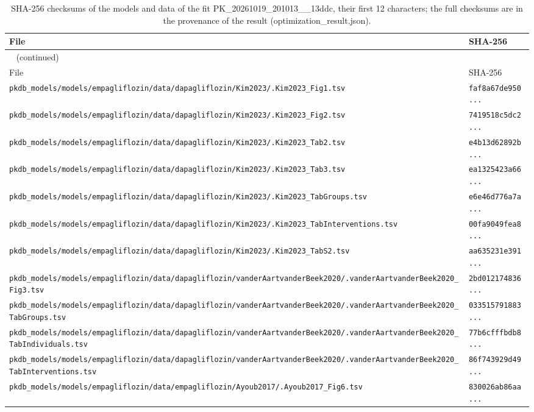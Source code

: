 \documentclass{article}
\begin{document}
\begin{longtable}{ll}
\caption{SHA-256 checksums of the models and data of the fit PK\_20261019\_201013\_\_13ddc, their first 12 characters; the full checksums are in the provenance of the result (optimization\_result.json).}\label{tab:checksums:PK_20261019_201013__13ddc} \\
\toprule
File & SHA-256 \\
\midrule
\endfirsthead
\multicolumn{2}{l}{\small\tablename~\thetable{} (continued)} \\
\toprule
File & SHA-256 \\
\midrule
\endhead
\bottomrule
\endlastfoot
\texttt{pkdb\_models/models/empagliflozin/data/dapagliflozin/Kim2023/.Kim2023\_Fig1.tsv} & \texttt{faf8a67de950...} \\
\texttt{pkdb\_models/models/empagliflozin/data/dapagliflozin/Kim2023/.Kim2023\_Fig2.tsv} & \texttt{7419518c5dc2...} \\
\texttt{pkdb\_models/models/empagliflozin/data/dapagliflozin/Kim2023/.Kim2023\_Tab2.tsv} & \texttt{e4b13d62892b...} \\
\texttt{pkdb\_models/models/empagliflozin/data/dapagliflozin/Kim2023/.Kim2023\_Tab3.tsv} & \texttt{ea1325423a66...} \\
\texttt{pkdb\_models/models/empagliflozin/data/dapagliflozin/Kim2023/.Kim2023\_TabGroups.tsv} & \texttt{e6e46d776a7a...} \\
\texttt{pkdb\_models/models/empagliflozin/data/dapagliflozin/Kim2023/.Kim2023\_TabInterventions.tsv} & \texttt{00fa9049fea8...} \\
\texttt{pkdb\_models/models/empagliflozin/data/dapagliflozin/Kim2023/.Kim2023\_TabS2.tsv} & \texttt{aa635231e391...} \\
\texttt{pkdb\_models/models/empagliflozin/data/dapagliflozin/vanderAartvanderBeek2020/.vanderAartvanderBeek2020\_Fig3.tsv} & \texttt{2bd012174836...} \\
\texttt{pkdb\_models/models/empagliflozin/data/dapagliflozin/vanderAartvanderBeek2020/.vanderAartvanderBeek2020\_TabGroups.tsv} & \texttt{033515791883...} \\
\texttt{pkdb\_models/models/empagliflozin/data/dapagliflozin/vanderAartvanderBeek2020/.vanderAartvanderBeek2020\_TabIndividuals.tsv} & \texttt{77b6cfffbdb8...} \\
\texttt{pkdb\_models/models/empagliflozin/data/dapagliflozin/vanderAartvanderBeek2020/.vanderAartvanderBeek2020\_TabInterventions.tsv} & \texttt{86f743929d49...} \\
\texttt{pkdb\_models/models/empagliflozin/data/empagliflozin/Ayoub2017/.Ayoub2017\_Fig6.tsv} & \texttt{830026ab86aa...} \\

\end{longtable}
\end{document}
